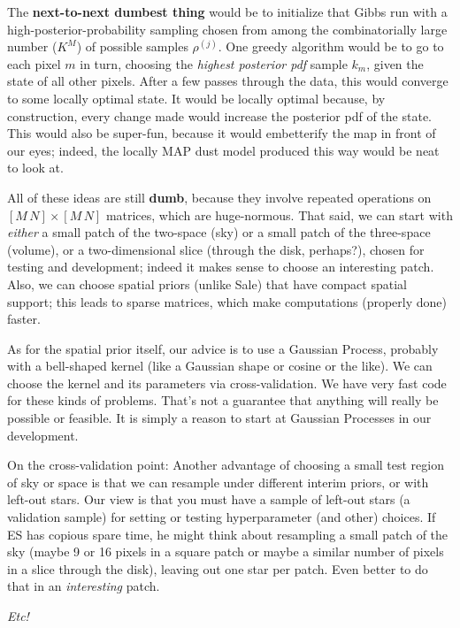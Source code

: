\documentclass[12pt, letterpaper]{article}
\begin{document}
The \textbf{next-to-next dumbest thing} would be to initialize that Gibbs run
  with a high-posterior-probability sampling chosen from among the combinatorially large
  number ($K^M$) of possible samples $\rho^{(j)}$.
One greedy algorithm would be to go to each pixel $m$ in turn,
  choosing the \emph{highest posterior pdf} sample $k_m$,
  given the state of all other pixels.
After a few passes through the data, this would converge
  to some locally optimal state.
It would be locally optimal because, by construction,
  every change made would increase the posterior pdf of the state.
This would also be super-fun, because it would embetterify the map in front of our eyes;
  indeed, the locally MAP dust model produced this way would be neat to look at.

All of these ideas are still \textbf{dumb},
  because they involve repeated operations on $[M\,N]\times[M\,N]$ matrices,
  which are huge-normous.
That said, we can start with \emph{either}
  a small patch of the two-space (sky)
  or a small patch of the three-space (volume),
  or a two-dimensional slice (through the disk, perhaps?),
  chosen for testing and development;
  indeed it makes sense to choose an interesting patch.
Also, we can choose spatial priors (unlike Sale)
  that have compact spatial support;
  this leads to sparse matrices,
  which make computations (properly done) faster.

As for the spatial prior itself,
  our advice is to use a Gaussian Process,
  probably with a bell-shaped kernel (like a Gaussian shape or cosine or the like).
We can choose the kernel and its parameters via cross-validation.
We have very fast code for these kinds of problems.
That's not a guarantee that anything will really be possible or feasible.
It is simply a reason to start at Gaussian Processes in our development.

On the cross-validation point:
Another advantage of choosing a small test region of sky or space
  is that we can resample under different interim priors,
  or with left-out stars.
Our view is that you must have a sample of left-out stars
  (a validation sample)
  for setting or testing hyperparameter (and other) choices.
If ES has copious spare time,
  he might think about resampling a small patch of the sky
  (maybe 9 or 16 pixels in a square patch
   or maybe a similar number of pixels in a slice through the disk),
  leaving out one star per patch.
Even better to do that in an \emph{interesting} patch.

\textsl{Etc!}
\end{document}
